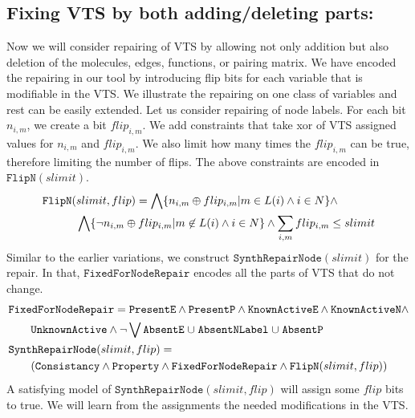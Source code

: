\subsection{Fixing VTS by both adding/deleting parts:}
%
Now we will consider repairing of VTS by allowing not only addition but also
deletion of the molecules, edges, functions, or pairing matrix.
%
We have encoded the repairing in our tool by introducing flip bits
for each variable that is modifiable in the VTS.
%
We illustrate the repairing on one class of variables and rest can be
easily extended.
%
Let us consider repairing of node labels.
%
For each bit $n_{i,m}$, we create a bit $flip_{i,m}$.
%
We add constraints that take xor of VTS assigned values for  $n_{i,m}$
and $flip_{i,m}$.
%
We also limit how many times the $flip_{i,m}$ can be true, therefore
limiting the number of flips.
%
The above constraints are encoded in $\texttt{FlipN}(slimit)$.
\begin{align*}
    &\texttt{FlipN}(slimit,flip) = \bigwedge \{n_{i,m}\oplus flip_{i,m}| m \in L(i) \land i \in N \} \land \\
  & \quad \quad \quad
    \bigwedge \{ \lnot n_{i,m}\oplus flip_{i,m}| m \not \in L(i) \land i \in N \} \land  \sum\limits_{i,m} flip_{i,m} \leq slimit
\end{align*}
%
Similar to the earlier variations, we construct
$\texttt{SynthRepairNode}(slimit)$ for the repair.
%
In that, $\texttt{FixedForNodeRepair}$ encodes all the parts of VTS that do not change.
\begin{align*}
    & \texttt{FixedForNodeRepair} =  \texttt{PresentE} \land  
      \texttt{PresentP} \land \texttt{KnownActiveE} \land \texttt{KnownActiveN}
      \land \\
  & \quad \quad \texttt{UnknownActive} \land \lnot 
    \bigvee \texttt{AbsentE} \;{\cup}\; \texttt{AbsentNLabel} \;{\cup}\;
    \texttt{AbsentP}\\
  &\texttt{SynthRepairNode}(slimit,flip) = \\
  & \quad\quad
    (  \texttt{Consistancy}\land \texttt{Property} \land
    \texttt{FixedForNodeRepair} \land \texttt{FlipN}(slimit,flip) )
\end{align*}
A satisfying model of $\texttt{SynthRepairNode}(slimit,flip)$ will assign some
$flip$ bits to true.
We will learn from the assignments the needed modifications in the VTS. 

